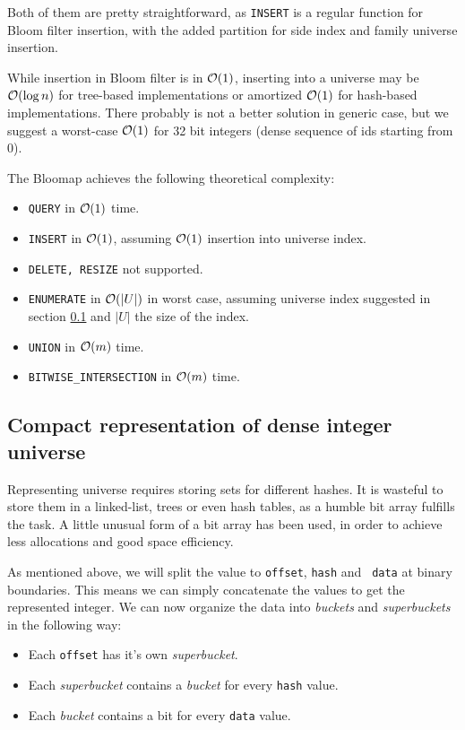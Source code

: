 Both of them are pretty straightforward, as {\tt INSERT} is a regular function
for Bloom filter insertion, with the added partition for side index and family
universe insertion.

While insertion in Bloom filter is in $\mathcal{O}(1)$, inserting into a universe may be
$\mathcal{O}(\log n)$ for tree-based implementations or amortized $\mathcal{O}(1)$ for hash-based
implementations. There probably is not a better solution in generic case,
but we suggest a worst-case $\mathcal{O}(1)$ for 32 bit integers (dense sequence of
ids starting from 0).

The Bloomap achieves the following theoretical complexity:

\begin{itemize}
	\item {\tt QUERY} in $\mathcal{O}(1)$ time.
	\item {\tt INSERT} in $\mathcal{O}(1)$, assuming $\mathcal{O}(1)$ insertion into universe
		index.
	\item {\tt DELETE{\rm ,} RESIZE} not supported.
	\item {\tt ENUMERATE} in $\mathcal{O}(|U|)$ in worst case, assuming universe index
		suggested in section \ref{sec-compact-representation} and $|U|$ the size
		of the index.
	\item {\tt UNION} in $\mathcal{O}(m)$ time.
	\item {\tt BITWISE\_INTERSECTION} in $\mathcal{O}(m)$ time.
\end{itemize}

\subsection{Compact representation of dense integer universe}
\label{sec-compact-representation}

Representing universe requires storing sets for different hashes. It is wasteful
to store them in a linked-list, trees or even hash tables, as a humble bit array
fulfills the task. A little unusual form of a bit array has been used, in order
to achieve less allocations and good space efficiency.

As mentioned above, we will split the value to {\tt offset}, {\tt hash} and {\tt
data} at binary boundaries. This means we can simply concatenate the values to
get the represented integer. We can now organize the data into {\it buckets} and
{\it superbuckets} in the following way:

\begin{itemize}
	\item Each {\tt offset} has it's own {\it superbucket}.
	\item Each {\it superbucket} contains a {\it bucket} for every {\tt hash} value.
	\item Each {\it bucket} contains a bit for every {\tt data} value.
\end{itemize}

